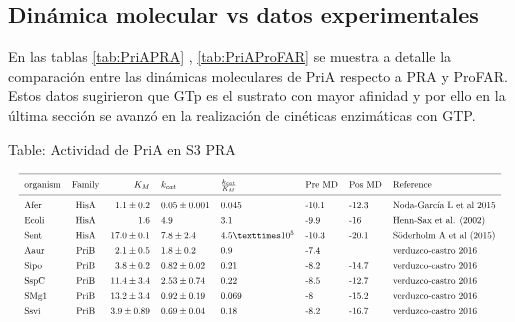 \documentclass[12pt,twoside]{reedthesis}
\begin{document}
  \clearpage  
  
  \subsection{Dinámica molecular vs datos
  experimentales}\label{dinamica-molecular-vs-datos-experimentales}
  
  En las tablas \autoref{tab:PriAPRA} , \autoref{tab:PriAProFAR} se
  muestra a detalle la comparación entre las dinámicas moleculares de PriA
  respecto a PRA y ProFAR. Estos datos sugirieron que GTp es el sustrato
  con mayor afinidad y por ello en la última sección se avanzó en la
  realización de cinéticas enzimáticas con GTP.
  
  Table: Actividad de PriA en S3 PRA \label{tab:PriAPRA}
  
  \[ 
  \resizebox{\columnwidth}{!}{%
  \begin{tabular}{ l c r l l l l l}
  \hline \\ [-1.5ex]
  organism  &Family & $K_M    $     & $k_{cat}$        & $\frac{k_{cat}}{K_M}$ &Pre MD & Pos MD & Reference  \\ [1ex]
  \hline \\ [-1.5ex]
  Afer        &HisA   & $1.1\pm0.2$   &$  0.05\pm0.001    $& 0.045                  &-10.1    &-12.3       &Noda-García L et al 2015\\ [1ex]
  Ecoli       &HisA   &$  1.6         $&$         4.9       $&3.1                   &-9.9   &-16       &Henn-Sax et al. (2002)\\ [1ex]
  Sent        &HisA   &$  17.0 \pm0.1 $&$ 7.8 \pm 2.4   $&$4.5 × 10^5          $&-10.3  &-20.1     &Söderholm A et al (2015)\\ [1ex]
  Aaur        &PriB   &$  2.1 \pm 0.5 $& $    1.8 \pm 0.2     $&0.9                   &-7.4   &              &verduzco-castro 2016\\ [1ex]
  Sipo        &PriB   &$  3.8\pm0.2     $&$0.82\pm0.02        $&0.21                  &-8.2     &-14.7       &verduzco-castro 2016\\ [1ex]
  SspC        &PriB   &$  11.4\pm3.4  $&$2.53\pm0.74      $&0.22                  &   -8.5    &-12.7     &verduzco-castro 2016\\ [1ex]
  SMg1        &PriB   &$  13.2\pm3.4  $&$0.92\pm0.19      $&0.069                 &-8     &-15.2     &verduzco-castro 2016\\ [1ex]
  Ssvi        &PriB   &$  3.9\pm0.89  $&$0.69\pm0.04      $&0.18                  &-8.2     &-16.7     &verduzco-castro 2016\\ [1ex]

\end{tabular}}\]
\end{document}
